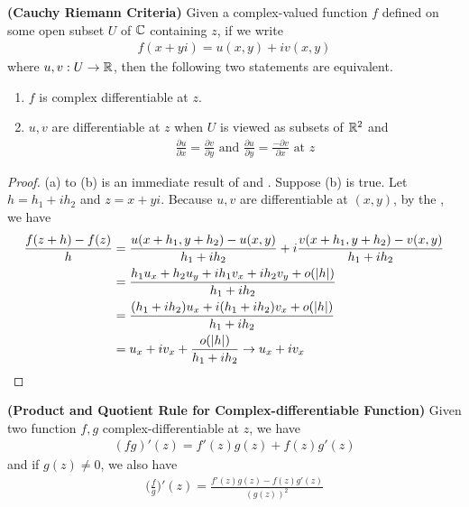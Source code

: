\documentclass{report}
\begin{document}
\begin{theorem}
\label{Cauchy Riemann Criteria}
\textbf{(Cauchy Riemann Criteria)} Given a complex-valued function $f$ defined on some open subset $U$ of $\mathbb{C}$ containing  $z$, if we write 
 \begin{align*}
f(x+yi)=u(x,y)+iv(x,y)
\end{align*}
where $u,v:U\rightarrow \mathbb{R}$, then the following two statements are equivalent.
\begin{enumerate}[label=(\alph*)]
  \item $f$ is complex differentiable at  $z$. 
  \item $u,v$ are differentiable at  $z$ when $U$ is viewed as subsets of $\mathbb{R}^2$ and 
\begin{align*}
    \frac{\partial u}{\partial x}=\frac{\partial v}{\partial y}\text{ and }\frac{\partial u}{\partial y}=\frac{-\partial v}{\partial x}\text{ at }z
\end{align*}
\end{enumerate}
\end{theorem}
\begin{proof}
(a) to (b) is an immediate result of  and . Suppose  (b) is true. Let $h=h_1+ih_2$ and $z=x+yi$. Because $u,v$ are differentiable at  $(x,y)$, by the , we have 
\begin{align*}
\frac{f(z+h)-f(z)}{h}&= \frac{u(x+h_1,y+h_2)-u(x,y)}{h_1+ih_2}+ i \frac{v(x+h_1,y+h_2)-v(x,y)}{h_1+ih_2}\\
&=\frac{h_1u_x+h_2u_y+ih_1v_x+ih_2v_y+o(\left|h\right|)}{h_1+ih_2}\\
&=\frac{(h_1+ih_2)u_x+i(h_1+ih_2)v_x+o(\left|h\right|)}{h_1+ih_2}\\
&=u_x+iv_x+\frac{o(\left|h\right|)}{h_1+ih_2}\to u_x+iv_x
\end{align*}
\end{proof}
\begin{theorem}
\label{Product and Quotient Rule for Holomorphic Function}
\textbf{(Product and Quotient Rule for Complex-differentiable  Function)} Given two function $f,g$ complex-differentiable at  $z$, we have 
 \begin{align*}
   (fg)'(z)= f'(z)g(z)+f(z)g'(z)
\end{align*}
and if $g(z)\neq 0$, we also have 
\begin{align*}
\Big(\frac{f}{g}\Big)'(z)=\frac{f'(z)g(z)-f(z)g'(z)}{(g(z))^2}
\end{align*}
\end{theorem}
\end{document}
